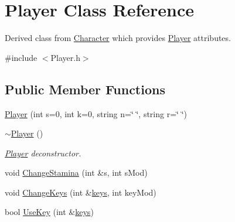 \hypertarget{classPlayer}{\section{Player Class Reference}
\label{classPlayer}
}


Derived class from \hyperlink{classCharacter}{Character} which provides \hyperlink{classPlayer}{Player} attributes.  




{\ttfamily \#include $<$Player.\-h$>$}

\subsection*{Public Member Functions}
\begin{DoxyCompactItemize}
\item 
\hyperlink{classPlayer_a3f78353312cc3cf41905fdc3accafb6c}{Player} (int s=0, int k=0, string n=\char`\"{} \char`\"{}, string r=\char`\"{} \char`\"{})
\item 
\hyperlink{classPlayer_a749d2c00e1fe0f5c2746f7505a58c062}{$\sim$\-Player} ()
\begin{DoxyCompactList}\small\item\em \hyperlink{classPlayer}{Player} deconstructor. \end{DoxyCompactList}\item 
void \hyperlink{classPlayer_a5bca1aa08cadb57984c488498a2e0e38}{Change\-Stamina} (int \&s, int s\-Mod)
\item 
void \hyperlink{classPlayer_a325d080bde1038593f942b17a5dd6ae2}{Change\-Keys} (int \&\hyperlink{classPlayer_ac46baa685ca2a266178f03b9e9877e65}{keys}, int key\-Mod)
\item 
bool \hyperlink{classPlayer_af839bdc1524d571568ea31a34f44f3ab}{Use\-Key} (int \&\hyperlink{classPlayer_ac46baa685ca2a266178f03b9e9877e65}{keys})
\end{DoxyCompactItemize}
